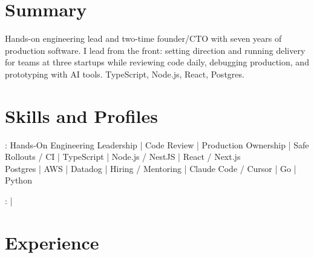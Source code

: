 \documentclass[print]{jack-resume}
\begin{document}
\pagecolor{darkmodeBackground}


\begin{minipage}[t][1cm][t]{.03\textwidth}
    \hfill
\end{minipage}

\section{Summary}
Hands-on engineering lead and two-time founder/CTO with seven years of production software. I lead from the front: setting direction and running delivery for teams at three startups while reviewing code daily, debugging production, and prototyping with AI tools. TypeScript, Node.js, React, Postgres.
\sectionsep

\section{Skills and Profiles}
:
Hands-On Engineering Leadership \hfill | \hfill
Code Review \hfill | \hfill
Production Ownership \hfill | \hfill
Safe Rollouts / CI \hfill | \hfill
TypeScript \hfill | \hfill
Node.js / NestJS \hfill | \hfill
React / Next.js \\
\hspace{1.0cm} Postgres \hfill | \hfill
AWS \hfill | \hfill
Datadog \hfill | \hfill
Hiring / Mentoring \hfill | \hfill
Claude Code / Cursor \hfill | \hfill
Go \hfill | \hfill
Python \\

\raggedright{
    :
      \href{https://www.linkedin.com/in/jack-sturtevant/}{ \ExternalLink} |
     \href{https://github.com/jacksturt}{ \ExternalLink}}

\section{Experience}
\end{document}

